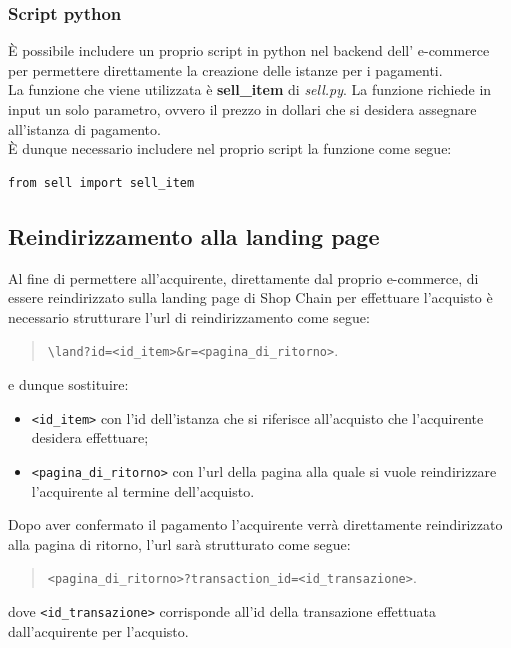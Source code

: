 \documentclass[a4paper, 12pt]{article}
\begin{document}
\subsubsection{Script python}
È possibile includere un proprio script in python nel backend dell' e-commerce per permettere direttamente la creazione delle istanze per i pagamenti.\\
La funzione che viene utilizzata è \textbf{sell\_item} di \textit{sell.py}. La funzione richiede in input un solo parametro, ovvero il prezzo in dollari che si desidera assegnare all'istanza di pagamento.\\
È dunque necessario includere nel proprio script la funzione come segue:
\begin{verbatim}
from sell import sell_item
\end{verbatim}
\subsection{Reindirizzamento alla landing page}
Al fine di permettere all'acquirente, direttamente dal proprio e-commerce, di essere reindirizzato sulla landing page di Shop Chain per effettuare l'acquisto è necessario strutturare l'url di reindirizzamento come segue:
\begin{quote}
  \verb|\land?id=<id_item>&r=<pagina_di_ritorno>|.
\end{quote}
e dunque sostituire:
\begin{itemize}
  \item \verb|<id_item>| con l'id dell'istanza che si riferisce all'acquisto che l'acquirente desidera effettuare;
  \item \verb|<pagina_di_ritorno>| con l'url della pagina alla quale si vuole reindirizzare l'acquirente al termine dell'acquisto.
\end{itemize}
Dopo aver confermato il pagamento l'acquirente verrà direttamente reindirizzato alla pagina di ritorno, l'url sarà strutturato come segue:
\begin{quote}
  \verb|<pagina_di_ritorno>?transaction_id=<id_transazione>|.
\end{quote}
dove \verb|<id_transazione>| corrisponde all'id della transazione effettuata dall'acquirente per l'acquisto.
\end{document}
